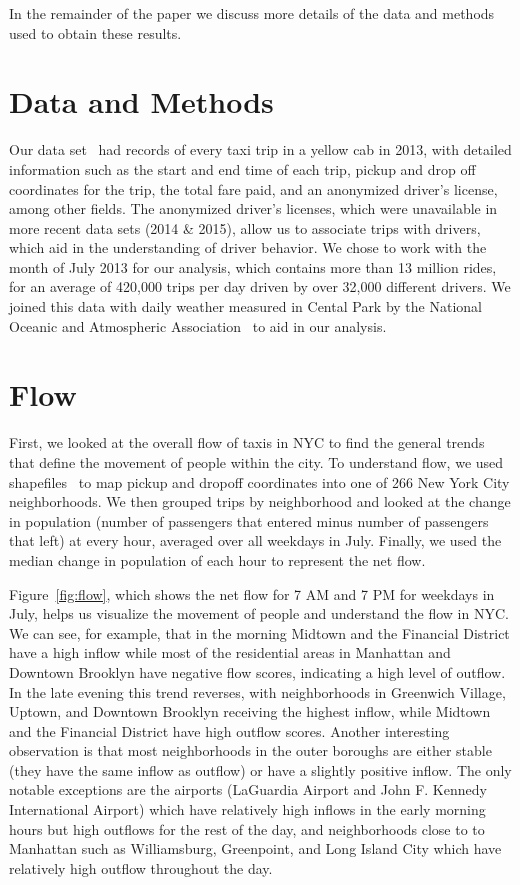 \documentclass[twocolumn]{article}
\begin{document}
In the remainder of the paper we discuss more details of the data and methods used to obtain these results.

\section{Data and Methods}
Our data set~\cite{WHONG:2014} had records of every taxi trip in a yellow cab in 2013, with detailed information such as the start and end time of each trip, pickup and drop off coordinates for the trip, the total fare paid, and an anonymized driver's license, among other fields. The anonymized driver's licenses, which were unavailable in more recent data sets (2014 \& 2015), allow us to associate trips with drivers, which aid in the understanding of driver behavior. %
We chose to work with the month of July 2013 for our analysis, which contains more than 13 million rides, for an average of 420,000 trips per day driven by over 32,000 different drivers.
We joined this data with daily weather measured in Cental Park by the National Oceanic and Atmospheric Association~\cite{NOAA:2016} to aid in our analysis.

\section{Flow}
First, we looked at the overall flow of taxis in NYC to find the general trends that define the movement of people within the city. To understand flow, we used shapefiles~\cite{PEDIACITIES:2015} to map pickup and dropoff coordinates into one of 266 New York City neighborhoods. We then grouped trips by neighborhood and looked at the change in population (number of passengers that entered minus number of passengers that left) at every hour, averaged over all weekdays in July. Finally, we used the median change in population of each hour to represent the net flow.

Figure~\ref{fig:flow}, which shows the net flow for 7 AM and 7 PM for weekdays in July, helps us visualize the movement of people and understand the flow in NYC. We can see, for example, that in the morning Midtown and the Financial District have a high inflow while most of the residential areas in Manhattan and Downtown Brooklyn have negative flow scores, indicating a high level of outflow. In the late evening this trend reverses, with neighborhoods in Greenwich Village, Uptown, and Downtown Brooklyn receiving the highest inflow, while Midtown and the Financial District have high outflow scores. Another interesting observation is that most neighborhoods in the outer boroughs are either stable (they have the same inflow as outflow) or have a slightly positive inflow. The only notable exceptions are the airports (LaGuardia Airport and John F. Kennedy International Airport) which have relatively high inflows in the early morning hours but high outflows for the rest of the day, and neighborhoods close to to Manhattan such as Williamsburg, Greenpoint, and Long Island City which have relatively high outflow throughout the day.
\end{document}
